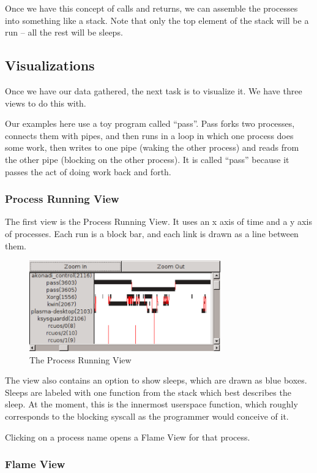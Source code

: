 \documentclass[10pt]{article}
\begin{document}
Once we have this concept of calls and returns, we can assemble the processes into something like a stack.  Note that only the top element of the stack will be a run -- all the rest will be sleeps.

\subsection{Visualizations}

Once we have our data gathered, the next task is to visualize it.  We have three views to do this with.

Our examples here use a toy program called ``pass''.  Pass forks two processes, connects them with pipes, and then runs in a loop in which one process does some work, then writes to one pipe (waking the other process) and reads from the other pipe (blocking on the other process).  It is called ``pass'' because it passes the act of doing work back and forth.

\subsubsection{Process Running View}

The first view is the Process Running View.  It uses an x axis of time and a y axis of processes.  Each run is a block bar, and each link is drawn as a line between them.

\begin{figure}[h]
\includegraphics[width=3.25in]{screenshot}
\caption{The Process Running View}
\end{figure}

The view also contains an option to show sleeps, which are drawn as blue boxes.  Sleeps are labeled with one function from the stack which best describes the sleep.  At the moment, this is the innermost userspace function, which roughly corresponds to the blocking syscall as the programmer would conceive of it.

Clicking on a process name opens a Flame View for that process.

\subsubsection{Flame View}
\end{document}
